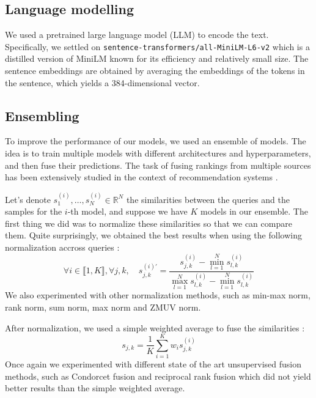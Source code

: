 \documentclass[switch, 12pt]{article}
\newcommand{\R}{\mathbb{R}}
\begin{document}
\begin{multicols}{2}
    \subsection{Language modelling}

    We used a pretrained large language model (LLM) to encode the text. Specifically, we settled on \texttt{sentence-transformers/all-MiniLM-L6-v2} which is a distilled version of MiniLM \cite{wang-2020} known for its efficiency and relatively small size. The sentence embeddings are obtained by averaging the embeddings of the tokens in the sentence, which yields a 384-dimensional vector.

    \subsection{Ensembling}

    To improve the performance of our models, we used an ensemble of models. The idea is to train multiple models with different architectures and hyperparameters, and then fuse their predictions. The task of fusing rankings from multiple sources has been extensively studied in the context of recommendation systems \cite{bachanowski-2023}.

    Let's denote $s_1^{(i)}, \dots, s_N^{(i)}\in\R^N$ the similarities between the queries and the samples for the $i$-th model, and suppose we have $K$ models in our ensemble. The first thing we did was to normalize these similarities so that we can compare them. Quite surprisingly, we obtained the best results when using the following normalization accross queries :
    \begin{equation}
        \forall i\in \llbracket1, K\rrbracket, \forall j,k, \quad s_{j,k}^{(i)'} = \frac{s_{j,k}^{(i)} - \min_{l=1}^N s_{l,k}^{(i)}}{\max_{l=1}^N s_{l,k}^{(i)} - \min_{l=1}^N s_{l,k}^{(i)}}
    \end{equation}
    We also experimented with other normalization methods, such as min-max norm, rank norm, sum norm, max norm and ZMUV norm.

    After normalization, we used a simple weighted average to fuse the similarities :
    \begin{equation}
        s_{j,k} = \frac{1}{K}\sum_{i=1}^K w_i s_{j,k}^{(i)}
    \end{equation}
    Once again we experimented with different state of the art unsupervised fusion methods, such as Condorcet fusion \cite{montague-2002} and reciprocal rank fusion \cite{cormack-2009} which did not yield better results than the simple weighted average.


\end{multicols}
\end{document}

